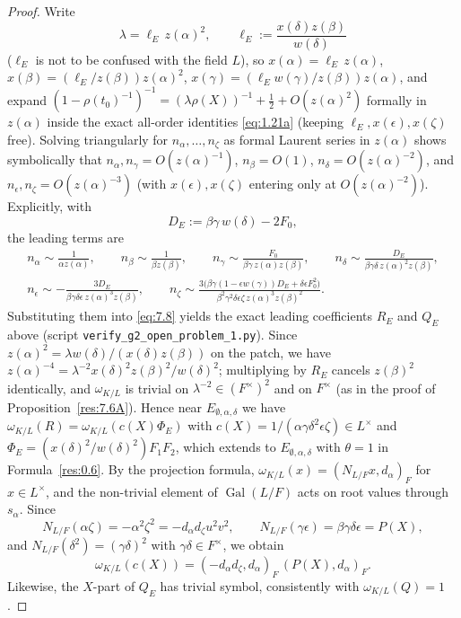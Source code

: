 \documentclass[12pt,letterpaper]{amsart}
\theoremstyle{plain}
\theoremstyle{definition}
\theoremstyle{remark}
\theoremstyle{definition}
\DeclareMathOperator{\Gal}{Gal}
\begin{document}
\begin{proof}
Write
\[
\lambda=\ell_E\,z(\alpha)^2,\qquad \ell_E:=\frac{x(\delta)z(\beta)}{w(\delta)}
\]
($\ell_E$ is not to be confused with the field $L$), so
$x(\alpha)=\ell_E\,z(\alpha)$, $x(\beta)=(\ell_E/z(\beta))z(\alpha)^2$,
$x(\gamma)=(\ell_Ew(\gamma)/z(\beta))z(\alpha)$, and expand
$(1-\rho(t_0)^{-1})^{-1}=(\lambda\rho(X))^{-1}+\frac12+O(z(\alpha)^2)$ formally
in $z(\alpha)$ inside the exact all-order identities \eqref{eq:1.21a} (keeping
$\ell_E,x(\epsilon),x(\zeta)$ free). Solving triangularly for
$n_\alpha,\dots,n_\zeta$ as formal Laurent series in $z(\alpha)$ shows
symbolically that $n_\alpha,n_\gamma=O(z(\alpha)^{-1})$, $n_\beta=O(1)$,
$n_\delta=O(z(\alpha)^{-2})$, and $n_\epsilon,n_\zeta=O(z(\alpha)^{-3})$ (with
$x(\epsilon),x(\zeta)$ entering only at $O(z(\alpha)^{-2})$). Explicitly, with
\[
D_E:=\beta\gamma\,w(\delta)-2F_0,
\]
the leading terms are
\[
\begin{gathered}
n_\alpha\sim\frac{1}{\alpha z(\alpha)},\qquad
n_\beta\sim\frac{1}{\beta z(\beta)},\qquad
n_\gamma\sim\frac{F_0}{\beta\gamma\,z(\alpha)z(\beta)},\qquad
n_\delta\sim\frac{D_E}{\beta\gamma\delta\,z(\alpha)^2z(\beta)},\\
n_\epsilon\sim-\frac{3D_E}{\beta\gamma\delta\epsilon\,z(\alpha)^3z(\beta)},\qquad
n_\zeta\sim\frac{3\bigl(\beta\gamma(1-\epsilon w(\gamma))D_E+\delta\epsilon F_0^2\bigr)}
{\beta^2\gamma^2\delta\epsilon\zeta\,z(\alpha)^3z(\beta)^2}.
\end{gathered}
\]
Substituting them into \eqref{eq:7.8} yields the exact leading coefficients
$R_E$ and $Q_E$ above (script \texttt{verify\_g2\_open\_problem\_1.py}). Since
$z(\alpha)^2=\lambda w(\delta)/(x(\delta)z(\beta))$ on the patch, we have
$z(\alpha)^{-4}=\lambda^{-2}x(\delta)^2z(\beta)^2/w(\delta)^2$; multiplying by
$R_E$ cancels $z(\beta)^2$ identically, and $\omega_{K/L}$ is trivial on
$\lambda^{-2}\in(F^\times)^2$ and on $F^\times$ (as in the proof of
Proposition~\ref{res:7.6A}). Hence near $E_{\emptyset,\alpha,\delta}$ we have
$\omega_{K/L}(R)=\omega_{K/L}(c(X)\Phi_E)$ with
$c(X)=1/(\alpha\gamma\delta^2\epsilon\zeta)\in L^\times$ and
$\Phi_E=(x(\delta)^2/w(\delta)^2)F_1F_2$, which extends to
$E_{\emptyset,\alpha,\delta}$ with $\theta=1$ in Formula~\ref{res:0.6}.
By the projection formula, $\omega_{K/L}(x)=(N_{L/F}x,d_\alpha)_F$ for
$x\in L^\times$, and the non-trivial element of $\Gal(L/F)$ acts on root values
through $s_\alpha$. Since
\[
N_{L/F}(\alpha\zeta)=-\alpha^2\zeta^2=-d_\alpha d_\zeta u^2v^2,\qquad
N_{L/F}(\gamma\epsilon)=\beta\gamma\delta\epsilon=P(X),
\]
and $N_{L/F}(\delta^2)=(\gamma\delta)^2$ with $\gamma\delta\in F^\times$, we obtain
\[
\omega_{K/L}(c(X))=(-d_\alpha d_\zeta,d_\alpha)_F\,(P(X),d_\alpha)_F.
\]
Likewise,
the $X$-part of $Q_E$ has trivial symbol, consistently with $\omega_{K/L}(Q)=1$.
\end{proof}
\end{document}
